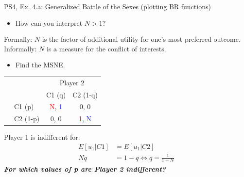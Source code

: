 \begin{frame}{PS4, Ex. 4.a: Generalized Battle of the Sexes (plotting BR functions)}
  \begin{multicols}{2}
    \begin{itemize}
      \item[(a)] How can you interpret $N > 1$?
    \end{itemize}
    Formally: $N$ is the factor of additional utility for one's most preferred outcome.\\\medskip
    Informally: $N$ is a measure for the conflict of interests.
    \begin{itemize}
      \item[(b)] Find the MSNE.
    \end{itemize}
    \vspace{-8pt}
    \begin{table}
      \begin{tabular}{cl|c|c|}
          & \multicolumn{1}{c}{} & \multicolumn{2}{c}{\color{blue}Player 2}\\
          \parbox[t]{1mm}{}
          &  &  &  \\
          & C1 (p)    & \textcolor{red}{N}, \textcolor{blue}{1} & 0, 0 \\
          & C2 (1-p)  & 0, 0 & \textcolor{red}{1}, \textcolor{blue}{N} \\
      \end{tabular}
    \end{table}
    Player 1 is indifferent for:
    \begin{align*}
      E[u_1|C1]&=E[u_1|C2]\\
      Nq &= 1-q \Leftrightarrow q = \frac{1}{1+N}
    \end{align*}
    \vspace{-8pt}
  \vfill\null \columnbreak
    \textbf{\textit{For which values of p are Player 2 indifferent?}}
  \vfill\null
  \end{multicols}
\end{frame}
